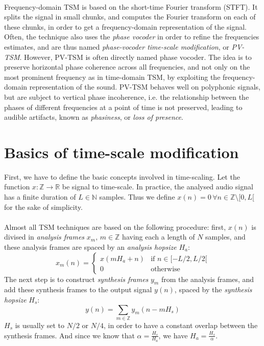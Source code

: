 \documentclass[letterpaper]{article}
\begin{document}
\paragraph{}
Frequency-domain TSM is based on the short-time Fourier transform (STFT). It
splits the signal in small chunks, and computes the Fourier transform on each
of these chunks, in order to get a frequency-domain representation of the
signal. Often, the technique also uses the \emph{phase vocoder} in order to
refine the frequencies estimates, and are thus named \emph{phase-vocoder
time-scale modification}, or \emph{PV-TSM}. However, PV-TSM is often directly
named phase vocoder. The idea is to preserve horizontal phase coherence across
all frequencies, and not only on the most prominent frequency as in time-domain
TSM, by exploiting the frequency-domain representation of the sound. PV-TSM
behaves well on polyphonic signals, but are subject to vertical phase
incoherence, i.e. the relationship between the phases of different frequencies
at a point of time is not preserved, leading to audible artifacts, known as
\emph{phasiness}, or \emph{loss of presence}.

\section{Basics of time-scale modification}
First, we have to define the basic concepts involved in time-scaling. Let the
function \(x:\mathbb{Z}\to\mathbb{R}\) be signal to time-scale. In practice,
the analysed audio signal has a finite duration of \(L\in\mathbb{N}\) samples.
Thus we define \(x(n)=0\,\forall n\in\mathbb{Z}\setminus [0,L[ \) for the sake of
simplicity.
\paragraph{}
Almost all TSM techniques are based on the following procedure: first, \(x(n)\)
is divised in \emph{analysis frames} \(x_m,\,m\in\mathbb{Z}\) having each a
length of \(N\) samples, and these analysis frames are spaced by an
\emph{analysis hopsize} \(H_a\):
\[x_m(n)=\begin{cases}
	x(mH_a + n) & \text{if }n\in [-L/2, L/2[ \\
	0           & \text{otherwise}
\end{cases}\]
The next step is to construct \emph{synthesis frames} \(y_m\) from the analysis
frames, and add these synthesis frames to the output signal \(y(n)\), spaced by
the \emph{synthesis hopsize} \(H_s\):
\[y(n) = \sum_{m\in\mathbb{Z}}y_m(n-mH_s)\]
\(H_s\) is usually set to \(N/2\) or \(N/4\), in order to have a constant
overlap between the synthesis frames. And since we know that
\(\alpha=\frac{H_s}{H_a}\), we have \(H_a=\frac{H_s}{\alpha}\).
\end{document}
